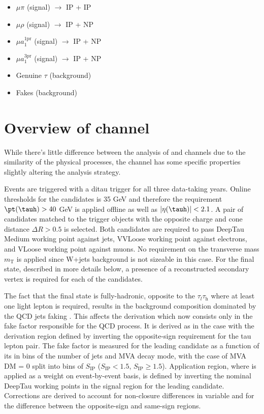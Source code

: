 \begin{itemize}
    \item $\mu\pi$ (signal) $\longrightarrow$ IP + IP
    \item $\mu\rho$ (signal) $\longrightarrow$ IP + NP
    \item $\mu a_1^\text{1pr}$ (signal) $\longrightarrow$ IP + NP
    \item $\mu a_1^\text{3pr}$ (signal) $\longrightarrow$ IP + NP
    \item Genuine $\tau$ (background)
    \item Fakes (background)
\end{itemize}

\section{Overview of \tata channel}\label{sec:tata}
While there's little difference between the analysis of \et and \mt channels due to the similarity of the physical processes, the \tata channel has some specific properties slightly altering the analysis strategy. 

Events are triggered with a ditau trigger for all three data-taking years. Online \pt thresholds for the candidates is 35 GeV and therefore the requirement $\pt(\tauh) > 40$ GeV is applied offline as well as $|\eta(\tauh)| < 2.1$. A pair of \tauh candidates matched to the trigger objects with the opposite charge and cone distance $\Delta R > 0.5$ is selected. Both candidates are required to pass DeepTau Medium working point against jets, VVLoose working point against electrons, and VLoose working point against muons. No requirement on the transverse mass $m_\text{T}$ is applied since W+jets background is not sizeable in this case. For the \aaa final state, described in more details below, a presence of a reconstructed secondary vertex is required for each of the \tauh candidates.

The fact that the \tata final state is fully-hadronic, opposite to the $\tau_l\tau_\mathrm{h}$ where at least one light lepton is required, results in the background composition dominated by the QCD jets faking \tauh. This affects the \ff derivation which now consists only in the fake factor responsible for the QCD process. It is derived as in the \et case with the derivation region defined by inverting the opposite-sign requirement for the tau lepton pair. The fake factor is measured for the leading \tauh candidate as a function of its \pt in bins of the number of jets and MVA decay mode, with the case of MVA DM = 0 split into bins of $S_\text{IP}$ ($S_\text{IP} < 1.5$, $S_\text{IP} \ge 1.5$). Application region, where \ff is applied as a weight on event-by-event basis, is defined by inverting the nominal DeepTau working points in the signal region for the leading \tauh candidate. Corrections are derived to account for non-closure differences in \met variable and for the difference between the opposite-sign and same-sign regions. 

